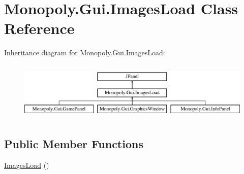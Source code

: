 \hypertarget{class_monopoly_1_1_gui_1_1_images_load}{}\section{Monopoly.\+Gui.\+Images\+Load Class Reference}
\label{class_monopoly_1_1_gui_1_1_images_load}
Inheritance diagram for Monopoly.\+Gui.\+Images\+Load\+:\begin{figure}[H]
\begin{center}
\leavevmode
\includegraphics[height=2.828283cm]{class_monopoly_1_1_gui_1_1_images_load}
\end{center}
\end{figure}
\subsection*{Public Member Functions}
\begin{DoxyCompactItemize}
\item 
\hyperlink{class_monopoly_1_1_gui_1_1_images_load_a9cde974a56cd0d34f372376d902131cd}{Images\+Load} ()
\end{DoxyCompactItemize}
